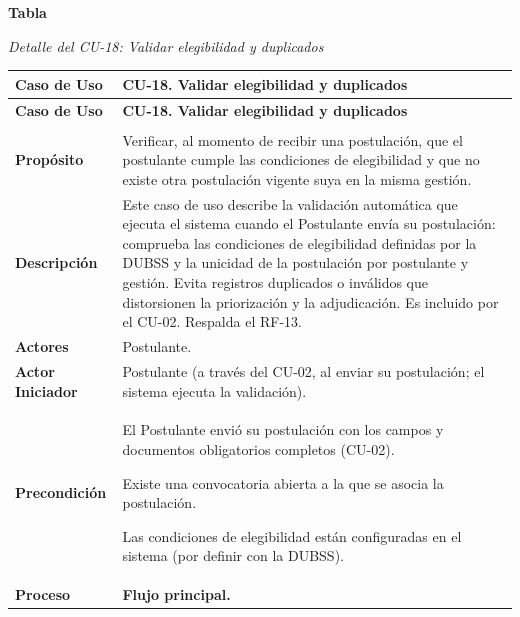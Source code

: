 \label{tab:detalle_cu18}
\noindent\textbf{Tabla~\thetable}\par\nopagebreak
\noindent\textit{Detalle del CU-18: Validar elegibilidad y duplicados}\par\nopagebreak
\begingroup\small\linespread{1}\selectfont
\begin{longtable}{>{\raggedright\arraybackslash}p{2.9cm} >{\raggedright\arraybackslash}p{12.6cm}}
\toprule
\textbf{Caso de Uso} & \textbf{CU-18. Validar elegibilidad y duplicados} \\
\midrule
\endfirsthead
\toprule
\textbf{Caso de Uso} & \textbf{CU-18. Validar elegibilidad y duplicados} \\
\midrule
\endhead
\endfoot
\bottomrule
\multicolumn{2}{l}{\textit{Nota.} Elaboración propia.} \\
\endlastfoot
\textbf{Propósito} & Verificar, al momento de recibir una postulación, que el postulante cumple las condiciones de elegibilidad y que no existe otra postulación vigente suya en la misma gestión. \\
\midrule
\textbf{Descripción} & Este caso de uso describe la validación automática que ejecuta el sistema cuando el Postulante envía su postulación: comprueba las condiciones de elegibilidad definidas por la DUBSS y la unicidad de la postulación por postulante y gestión. Evita registros duplicados o inválidos que distorsionen la priorización y la adjudicación. Es incluido por el CU-02. Respalda el RF-13. \\
\midrule
\textbf{Actores} & Postulante. \\
\midrule
\textbf{Actor Iniciador} & Postulante (a través del CU-02, al enviar su postulación; el sistema ejecuta la validación). \\
\midrule
\textbf{Precondición} & \vspace{-\baselineskip}\begin{cuvin}
    \item El Postulante envió su postulación con los campos y documentos obligatorios completos (CU-02).
    \item Existe una convocatoria abierta a la que se asocia la postulación.
    \item Las condiciones de elegibilidad están configuradas en el sistema (por definir con la DUBSS).
\end{cuvin} \\
\midrule
\textbf{Proceso} & \textbf{Flujo principal.}

\end{longtable}
